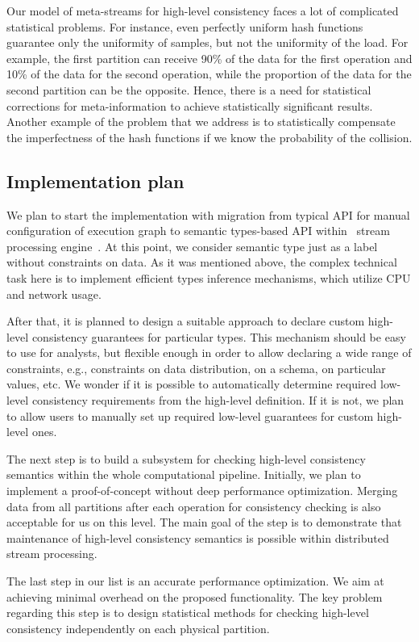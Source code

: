 Our model of meta-streams for high-level consistency faces a lot of complicated statistical problems. For instance, even perfectly uniform hash functions guarantee only the uniformity of samples, but not the uniformity of the load. For example, the first partition can receive 90\% of the data for the first operation and 10\% of the data for the second operation, while the proportion of the data for the second partition can be the opposite. Hence, there is a need for statistical corrections for meta-information to achieve statistically significant results. Another example of the problem that we address is to statistically compensate the imperfectness of the hash functions if we know the probability of the collision.  

\subsection{Implementation plan}

We plan to start the implementation with migration from typical API for manual configuration of execution graph to semantic types-based API within \FlameStream\ stream processing engine~\cite{we2018beyondmr}. At this point, we consider semantic type just as a label without constraints on data. As it was mentioned above, the complex technical task here is to implement efficient types inference mechanisms, which utilize CPU and network usage.

After that, it is planned to design a suitable approach to declare custom high-level consistency guarantees for particular types. This mechanism should be easy to use for analysts, but flexible enough in order to allow declaring a wide range of constraints, e.g., constraints on data distribution, on a schema, on particular values, etc.  We wonder if it is possible to automatically determine required low-level consistency requirements from the high-level definition. If it is not, we plan to allow users to manually set up required low-level guarantees for custom high-level ones.

The next step is to build a subsystem for checking high-level consistency semantics within the whole computational pipeline. Initially, we plan to implement a proof-of-concept without deep performance optimization. Merging data from all partitions after each operation for consistency checking is also acceptable for us on this level. The main goal of the step is to demonstrate that maintenance of high-level consistency semantics is possible within distributed stream processing.

The last step in our list is an accurate performance optimization. We aim at achieving minimal overhead on the proposed functionality. The key problem regarding this step is to design statistical methods for checking high-level consistency independently on each physical partition.
